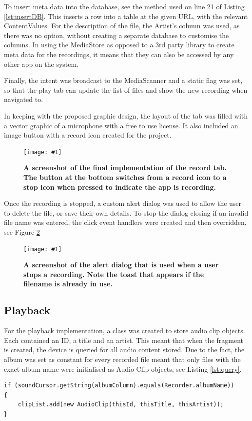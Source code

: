 \documentclass[conference]{acmsiggraph}
\newcommand{\figuremacroF}[3]{
	\begin{figure}[H] %
		\centering
		\texttt{[image: \#1]}
		\caption[#2]{\textbf{#2}}
		\label{fig:#1}
	\end{figure}
}
\begin{document}
To insert meta data into the database, see the method used on line 21 of Listing \ref{lst:insertDB}. This inserts a row into a table at the given URL, with the relevant ContentValues. For the description of the file, the Artist's column was used, as there was no option, without creating a separate database to customise the columns. In using the MediaStore as opposed to a 3rd party library to create meta data for the recordings, it means that they can also be accessed by any other app on the system.

Finally, the intent was broadcast to the MediaScanner and a static flag was set, so that the play tab can update the list of files and show the new recording when navigated to.

In keeping with the proposed graphic design, the layout of the tab was filled with a vector graphic of a microphone with a free to use license. \cite{microphone} It also included an image button with a record icon created for the project.

\figuremacroF
{PlayTabSS}
{A screenshot of the final implementation of the record tab. The button at the bottom switches from a record icon to a stop icon when pressed to indicate the app is recording.}
{1.0}

Once the recording is stopped, a custom alert dialog was used to allow the user to delete the file, or save their own details. To stop the dialog closing if an invalid file name was entered, the click event handlers were created and then overridden, see Figure \ref{fig:dialog}

\figuremacroF
{dialog}
{A screenshot of the alert dialog that is used when a user stops a recording. Note the toast that appears if the filename is already in use.}
{1.0}

\subsection{Playback}

For the playback implementation, a class was created to store audio clip objects. Each contained an ID, a title and an artist. This meant that when the fragment is created, the device is queried for all audio content stored. Due to the fact, the album was set as constant for every recorded file meant that only files with the exact album name were initialised as Audio Clip objects, see Listing \ref{lst:query}.

\begin{lstlisting}[label = {lst:query}, caption={Conditional Statement for Creating Audio Clips}]
if (soundCursor.getString(albumColumn).equals(Recorder.albumName))
{
	clipList.add(new AudioClip(thisId, thisTitle, thisArtist));
}
\end{lstlisting}
\end{document}
